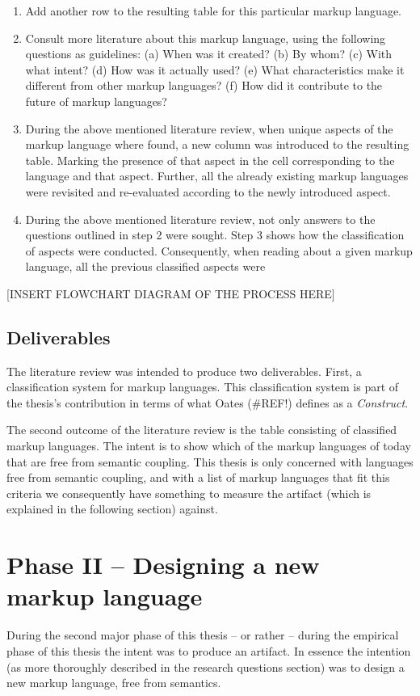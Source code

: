 \documentclass{scrreprt}
\begin{document}
\begin{enumerate}
\item Add another row to the resulting table for this particular markup language.
\item Consult more literature about this markup language, using the following questions as guidelines: (a) When was it created? (b) By whom? (c) With what intent? (d) How was it actually used? (e) What characteristics make it different from other markup languages? (f) How did it contribute to the future of markup languages?
\item During the above mentioned literature review, when unique aspects of the markup language where found, a new column was introduced to the resulting table. Marking the presence of that aspect in the cell corresponding to the language and that aspect. Further, all the already existing markup languages were revisited and re-evaluated according to the newly introduced aspect.
\item During the above mentioned literature review, not only answers to the questions outlined in step 2 were sought. Step 3 shows how the classification of aspects were conducted. Consequently, when reading about a given markup language, all the previous classified aspects were 
\end{enumerate}

[INSERT FLOWCHART DIAGRAM OF THE PROCESS HERE]


\subsection{Deliverables}
The literature review was intended to produce two deliverables. First, a classification system for markup languages. This classification system is part of the thesis's contribution in terms of what Oates (\#REF!) defines as a \emph{Construct}.

The second outcome of the literature review is the table consisting of classified markup languages. The intent is to show which of the markup languages of today that are free from semantic coupling. This thesis is only concerned with languages free from semantic coupling, and with a list of markup languages that fit this criteria we consequently have something to measure the artifact (which is explained in the following section) against.



\section{Phase II -- Designing a new markup language}
During the second major phase of this thesis -- or rather -- during the empirical phase of this thesis the intent was to produce an artifact. In essence the intention (as more thoroughly described in the research questions section) was to design a new markup language, free from semantics.
\end{document}
